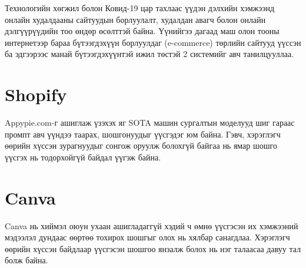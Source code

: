 Технологийн хөгжил болон Ковид-19 цар тахлаас үүдэн дэлхийн хэмжээнд онлайн худалдааны сайтуудын борлуулалт, худалдан авагч болон онлайн дэлгүүрүүдийн тоо өндөр өсөлттэй байна.
Үүнийгээ дагаад маш олон тооны интернетээр бараа бүтээгдэхүүн борлуулдаг (e-commerce) төрлийн сайтууд үүссэн ба эдгээрээс манай бүтээгдэхүүнтэй ижил төстэй 2 системийг авч танилцууллаа.

\section{Shopify}
Appypie.com-г ашиглаж үзэхэх яг SOTA машин сургалтын моделууд шиг гараас промпт авч  үүндээ таарах, шошгонуудыг үүсгэдэг юм байна. Гэвч, хэрэглэгч өөрийн хүссэн зурагнуудыг сонгож оруулж болохгүй байгаа нь ямар шошго үүсгэх нь тодорхойгүй байдал үүгэж байна.

\section{Canva}
Canva нь хиймэл оюун ухаан ашигладаггүй хэдий ч өмнө үүсгэсэн их хэмжээний мэдээлэл дундаас өөртөө тохирох шошгыг олох нь хялбар санагдлаа. Хэрэглэгч өөрийн хүссэн байдлаар үүсгэсэн шошгоо янзалж болох нь нэг талаасаа давуу тал болж байна.
